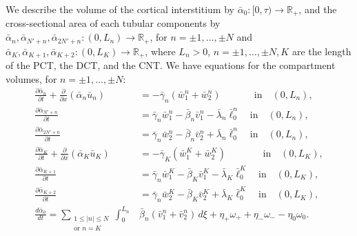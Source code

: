 \documentclass{article}
\begin{document}
We describe the volume of the cortical interstitium by $\bar{\alpha}_0:[0,\tau)\to \mathbb{R}_+$, and the cross-sectional area of each tubular components by $\bar{\alpha}_{n},\bar{\alpha}_{N'+n},\bar{\alpha}_{2N'+n}:(0,L_n)\to \mathbb{R}_+$, for $n=\pm 1,\dots,\pm N$ and $\bar{\alpha}_K,\bar{\alpha}_{K+1},\bar{\alpha}_{K+2}:(0,L_K)\to \mathbb{R}_+$, where $L_n>0$, $n=\pm 1,\dots,\pm N,K$ are the length of the PCT, the DCT, and the CNT.
We have equations for the compartment volumes, for $n=\pm 1,\dots,\pm N$:
\begin{align}
    \frac{\partial \bar{\alpha}_n}{\partial t} + \frac{\partial}{\partial x}(\bar{\alpha}_n\bar{u}_n) &= -\bar{\gamma}_n(\bar{w}_{1}^n+\bar{w}_{2}^n)\quad \quad \quad \ \ \text{in}\quad (0,L_n),\\
    \frac{\partial \bar{\alpha}_{N'+n}}{\partial t} &= \bar{\gamma}_{n}\bar{w}_{1}^n-\bar{\beta}_n\bar{v}_1^n-\bar{\lambda}_n\bar{\ell}_0^n\quad \text{in}\quad (0,L_n),\\
    \frac{\partial \bar{\alpha}_{2N'+n}}{\partial t} &= \bar{\gamma}_{n}\bar{w}_{2}^n-\bar{\beta}_n\bar{v}_2^n+\bar{\lambda}_n\bar{\ell}_0^n\quad \text{in}\quad (0,L_n),\\
    \frac{\partial \bar{\alpha}_K}{\partial t} + \frac{\partial}{\partial x}(\bar{\alpha}_K\bar{u}_K) &= -\bar{\gamma}_K(\bar{w}_{1}^K+\bar{w}_{2}^K)\qquad \quad \ \ \ \, \text{in}\quad (0,L_K),\\
    \frac{\partial \bar{\alpha}_{K+1}}{\partial t} &= \bar{\gamma}_{n}\bar{w}_{1}^K-\bar{\beta}_K\bar{v}_1^K-\bar{\lambda}_K\bar{\ell}_0^K\quad \text{in}\quad (0,L_K),\\
    \frac{\partial \bar{\alpha}_{K+2}}{\partial t} &= \bar{\gamma}_{n}\bar{w}_{2}^K-\bar{\beta}_K\bar{v}_2^K+\bar{\lambda}_K\bar{\ell}_0^K\quad \text{in}\quad (0,L_K),\\
    \frac{d \bar{\alpha}_0}{d t} = 
        \sum_{\substack{1\leq|n|\leq N\\\text{or } n=K}}\int_0^{L_n}&\bar{\beta}_n(\bar{v}_{1}^n+\bar{v}_{2}^n)\,d\xi+\eta_+\omega_++\eta_-\omega_--\eta_0\omega_0.
\end{align}
\end{document}
